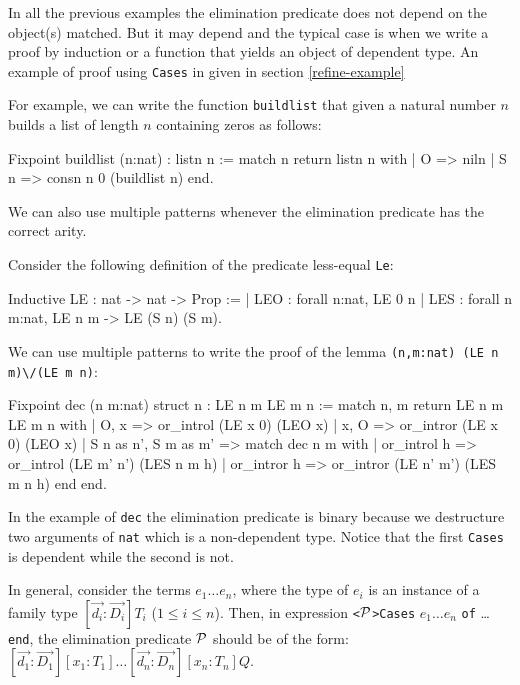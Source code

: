 In all the previous examples the elimination predicate does not depend
on the object(s) matched. But it may depend and the typical case 
is when we write a proof by induction or a function that yields an
object of dependent type. An example of proof using \texttt{Cases} in
given in section \ref{refine-example}

For example, we can write 
the function \texttt{buildlist} that given a natural number
$n$ builds a list of length $n$ containing zeros as follows:

\begin{coq_example}
Fixpoint buildlist (n:nat) : listn n :=
  match n return listn n with
  | O => niln
  | S n => consn n 0 (buildlist n)
  end.
\end{coq_example}

We can also use multiple patterns whenever the elimination predicate has
the correct arity. 

Consider the following definition of the predicate less-equal
\texttt{Le}:

\begin{coq_example}
Inductive LE : nat -> nat -> Prop :=
  | LEO : forall n:nat, LE 0 n
  | LES : forall n m:nat, LE n m -> LE (S n) (S m).
\end{coq_example}

We can use multiple patterns to write  the proof of the lemma
 \texttt{(n,m:nat) (LE n m)}\verb=\/=\texttt{(LE m n)}:

\begin{coq_example}
Fixpoint dec (n m:nat) {struct n} : LE n m \/ LE m n :=
  match n, m return LE n m \/ LE m n with
  | O, x => or_introl (LE x 0) (LEO x)
  | x, O => or_intror (LE x 0) (LEO x)
  | S n as n', S m as m' =>
      match dec n m with
      | or_introl h => or_introl (LE m' n') (LES n m h)
      | or_intror h => or_intror (LE n' m') (LES m n h)
      end
  end.
\end{coq_example}
In the example of \texttt{dec} the elimination predicate is binary
because we destructure two arguments of \texttt{nat} which is a
non-dependent type. Notice that the first \texttt{Cases} is dependent while 
the second is not.

In general, consider the terms $e_1\ldots e_n$,
where  the type of $e_i$ is an instance of a family type
$[\vec{d_i}:\vec{D_i}]T_i$  ($1\leq i
\leq n$). Then, in expression \texttt{<}${\cal P}$\texttt{>Cases}  $e_1\ldots
e_n$ \texttt{of} \ldots \texttt{end}, the 
elimination predicate ${\cal P}$ should be of the form:
$[\vec{d_1}:\vec{D_1}][x_1:T_1]\ldots [\vec{d_n}:\vec{D_n}][x_n:T_n]Q.$

